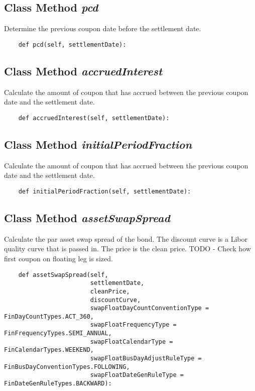 \documentclass[twoside,11pt]{book}
\begin{document}
\subsection{Class Method {\it pcd}}
Determine the previous coupon date before the settlement date. 

\begin{lstlisting}
    def pcd(self, settlementDate):
\end{lstlisting}

\subsection{Class Method {\it accruedInterest}}
Calculate the amount of coupon that has accrued between the previous coupon date and the settlement date. 

\begin{lstlisting}
    def accruedInterest(self, settlementDate):
\end{lstlisting}

\subsection{Class Method {\it initialPeriodFraction}}
Calculate the amount of coupon that has accrued between the previous coupon date and the settlement date. 

\begin{lstlisting}
    def initialPeriodFraction(self, settlementDate):
\end{lstlisting}

\subsection{Class Method {\it assetSwapSpread}}
Calculate the par asset swap spread of the bond. The discount curve is a Libor quality curve that is passed in. The price is the clean price. TODO - Check how first coupon on floating leg is sized. 

\begin{lstlisting}
    def assetSwapSpread(self, 
                        settlementDate, 
                        cleanPrice, 
                        discountCurve, 
                        swapFloatDayCountConventionType = FinDayCountTypes.ACT_360, 
                        swapFloatFrequencyType = FinFrequencyTypes.SEMI_ANNUAL,
                        swapFloatCalendarType = FinCalendarTypes.WEEKEND,
                        swapFloatBusDayAdjustRuleType = FinBusDayConventionTypes.FOLLOWING,
                        swapFloatDateGenRuleType = FinDateGenRuleTypes.BACKWARD):
\end{lstlisting}
\end{document}
